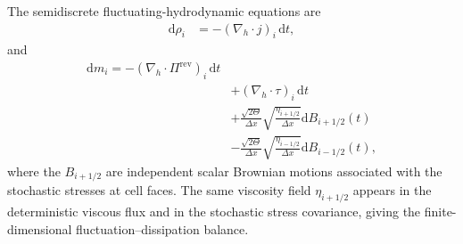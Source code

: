 \documentclass[11pt,twoside,fleqn]{article}
\renewcommand{\d}{\mathrm{d}}
\begin{document}
The semidiscrete fluctuating-hydrodynamic equations are
\begin{align}
    \d \rho_i
    &=
    -(\nabla_h\cdot j)_i\,\d t,
    \label{eq:fhd_density_equation}
\end{align}
and
\begin{align}
    \d m_i
    =
    -(\nabla_h\cdot \Pi^{\mathrm{rev}})_i\,\d t
    \\
    &+
    (\nabla_h\cdot \tau)_i\,\d t
    \\
    &+
    \frac{\sqrt{2\Theta}}{\Delta x}
    \sqrt{\frac{\eta_{i+1/2}}{\Delta x}}
    \d B_{i+1/2}(t)
    \\
    &-
    \frac{\sqrt{2\Theta}}{\Delta x}
    \sqrt{\frac{\eta_{i-1/2}}{\Delta x}}
    \d B_{i-1/2}(t),
    \label{eq:fhd_momentum_equation}
\end{align}
where the \(B_{i+1/2}\) are independent scalar Brownian motions associated with
the stochastic stresses at cell faces. The same viscosity field
\(\eta_{i+1/2}\) appears in the deterministic viscous flux and in the stochastic
stress covariance, giving the finite-dimensional fluctuation--dissipation
balance.
\end{document}
